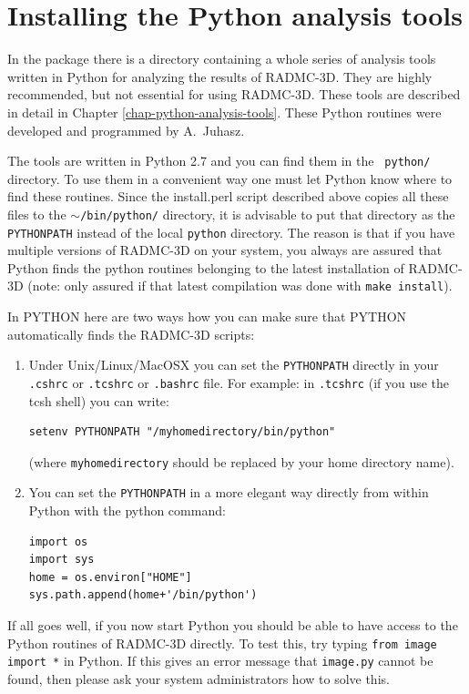 \documentclass{report}
\begin{document}
\section{Installing the Python analysis tools}
\label{sec-install-pythonscripts}
In the package there is a directory containing a whole series of analysis
tools written in Python for analyzing the results of RADMC-3D. They are
highly recommended, but not essential for using RADMC-3D. These tools are
described in detail in Chapter \ref{chap-python-analysis-tools}. These
Python routines were developed and programmed by A.~Juhasz. 

The tools are written in Python 2.7 and you can find them in the {\small\tt
  python/} directory. To use them in a convenient way one must let Python
know where to find these routines. Since the install.perl script described
above copies all these files to the $\sim${\small\tt /bin/python/}
directory, it is advisable to put that directory as the {\small\tt
  PYTHONPATH} instead of the local {\small\tt python} directory.  The reason
is that if you have multiple versions of RADMC-3D on your system, you always
are assured that Python finds the python routines belonging to the latest
installation of RADMC-3D (note: only assured if that latest compilation was
done with {\small\tt make install}).

In PYTHON here are two ways how you can make sure that PYTHON automatically
finds the RADMC-3D scripts:
\begin{enumerate}
\item Under Unix/Linux/MacOSX you can set the {\small\tt PYTHONPATH} directly in your
  {\small\tt .cshrc} or {\small\tt .tcshrc} or {\small\tt .bashrc} file. For example: in
  {\small\tt .tcshrc} (if you use the tcsh shell) you can write:
{\small\begin{verbatim}
setenv PYTHONPATH "/myhomedirectory/bin/python"
\end{verbatim}}
(where {\small\tt myhomedirectory} should be replaced by your home directory name). 
\item You can set the {\small\tt PYTHONPATH} in a more elegant way directly from within
Python with the python command:
{\small\begin{verbatim}
import os
import sys
home = os.environ["HOME"]
sys.path.append(home+'/bin/python')
\end{verbatim}}
\end{enumerate}
If all goes well, if you now start Python you should be able to have access
to the Python routines of RADMC-3D directly. To test this, try typing
{\small\tt from image import *} in Python. If this gives an error message
that {\small\tt image.py} cannot be found, then please ask your system
administrators how to solve this.
\end{document}
